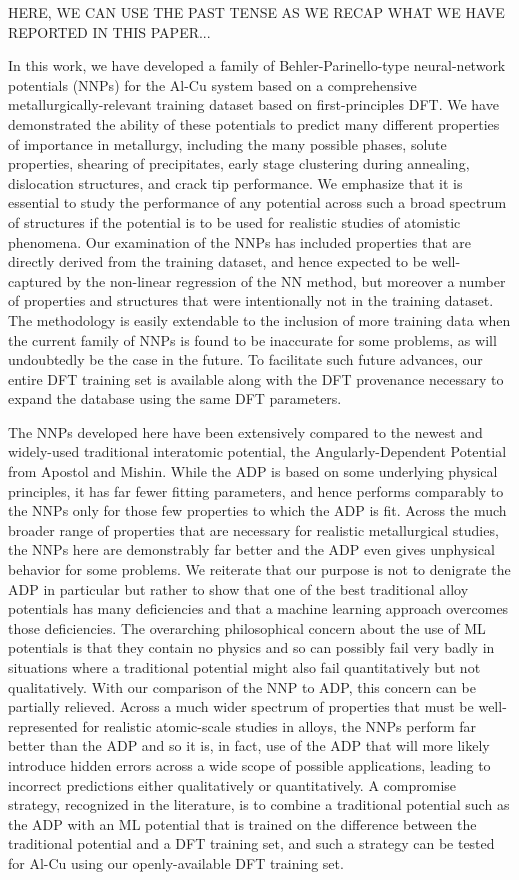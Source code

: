 \documentclass{article}
\begin{document}
HERE, WE CAN USE THE PAST TENSE AS WE RECAP WHAT WE HAVE REPORTED IN THIS PAPER...

In this work, we have developed a family of Behler-Parinello-type neural-network potentials (NNPs) for the Al-Cu system based on a comprehensive metallurgically-relevant training dataset based on first-principles DFT.  We have demonstrated the ability of these potentials to predict many different properties of importance in metallurgy, including the many possible phases, solute properties, shearing of precipitates, early stage clustering during annealing, dislocation structures, and crack tip performance.  We emphasize that it is essential to study the performance of any potential across such a broad spectrum of structures if the potential is to be used for realistic studies of atomistic phenomena.  Our examination of the NNPs has included properties that are directly derived from the training dataset, and hence expected to be well-captured by the non-linear regression of the NN method, but moreover a number of properties and structures that were intentionally not in the training dataset.  The methodology is easily extendable to the inclusion of more training data when the current family of NNPs is found to be inaccurate for some problems, as will undoubtedly be the case in the future.  To facilitate such future advances, our entire DFT training set is available along with the DFT provenance necessary to expand the database using the same DFT parameters.

The NNPs developed here have been extensively compared to the newest and widely-used traditional interatomic potential, the Angularly-Dependent Potential from Apostol and Mishin.  While the ADP is based on some underlying physical principles, it has far fewer fitting parameters, and hence performs comparably to the NNPs only for those few properties to which the ADP is fit.  Across the much broader range of properties that are necessary for realistic metallurgical studies, the NNPs here are demonstrably far better and the ADP even gives unphysical behavior for some problems.  We reiterate that our purpose is not to denigrate the ADP in particular but rather to show that one of the best traditional alloy potentials has many deficiencies and that a machine learning approach overcomes those deficiencies.  The overarching philosophical concern about the use of ML potentials is that they contain no physics and so can possibly fail very badly in situations where a traditional potential might also fail quantitatively but not qualitatively.  With our comparison of the NNP to ADP, this concern can be partially relieved.  Across a much wider spectrum of properties that must be well-represented for realistic atomic-scale studies in alloys, the NNPs perform far better than the ADP and so it is, in fact, use of the ADP that will more likely introduce hidden errors across a wide scope of possible applications, leading to incorrect predictions either qualitatively or quantitatively.  A compromise strategy, recognized in the literature, is to combine a traditional potential such as the ADP with an ML potential that is trained on the difference between the traditional potential and a DFT training set, and such a strategy can be tested for Al-Cu using our openly-available DFT training set.
\end{document}

